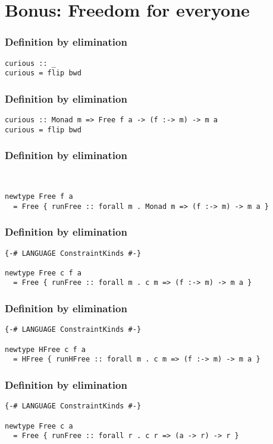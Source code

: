\documentclass[pdf]{beamer}
\begin{document}
\section{Bonus: Freedom for everyone}

\begin{frame}[fragile]
  \frametitle{Definition by elimination}
  \pause
\begin{lstlisting}
curious :: _
curious = flip bwd
\end{lstlisting}
\end{frame}

\begin{frame}[fragile]
  \frametitle{Definition by elimination}
\begin{lstlisting}
curious :: Monad m => Free f a -> (f :-> m) -> m a
curious = flip bwd
\end{lstlisting}
\end{frame}

\begin{frame}[fragile]
  \frametitle{Definition by elimination}
\begin{lstlisting}


newtype Free f a 
  = Free { runFree :: forall m . Monad m => (f :-> m) -> m a }
\end{lstlisting}
\end{frame}

\begin{frame}[fragile]
  \frametitle{Definition by elimination}
\begin{lstlisting}
{-# LANGUAGE ConstraintKinds #-}

newtype Free c f a 
  = Free { runFree :: forall m . c m => (f :-> m) -> m a }
\end{lstlisting}
\end{frame}

\begin{frame}[fragile]
  \frametitle{Definition by elimination}
\begin{lstlisting}
{-# LANGUAGE ConstraintKinds #-}

newtype HFree c f a 
  = HFree { runHFree :: forall m . c m => (f :-> m) -> m a }
\end{lstlisting}
\end{frame}

\begin{frame}[fragile]
  \frametitle{Definition by elimination}
\begin{lstlisting}
{-# LANGUAGE ConstraintKinds #-}

newtype Free c a 
  = Free { runFree :: forall r . c r => (a -> r) -> r }
\end{lstlisting}
\end{frame}
\end{document}
